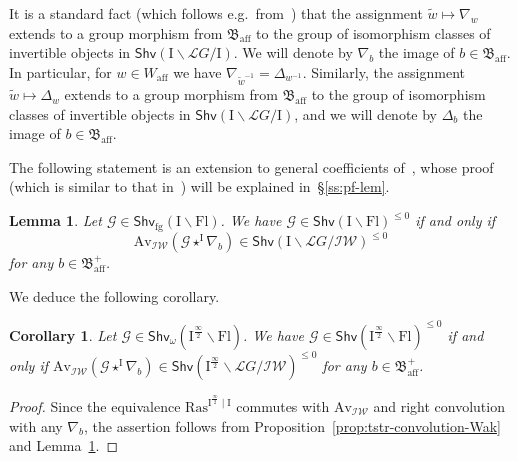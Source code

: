 \documentclass[11pt]{amsart}
\numberwithin{equation}{section}
\theoremstyle{plain}
\newtheorem{lem}[thm]{Lemma}
\newtheorem{corollary}[thm]{Corollary}
\theoremstyle{definition}
\newcommand{\sG}{{\mathcal G}}
\newcommand{\I}{{\mathrm I}}
\newcommand{\sL}{{\mathcal L}}
\newcommand{\semi}{{{\frac{\infty}{2}}}}
\newcommand{\Av}{\mathrm{Av}}
\newcommand{\IW}{\mathcal{IW}}
\newcommand{\af}{\mathrm{aff}}
\newcommand{\Shv}{\mathsf{Shv}}
\newcommand{\Shvfg}{\mathsf{Shv}_{\mathrm{fg}}}
\newcommand{\Ras}{\mathrm{Ras}}
\newcommand{\Fl}{\mathrm{Fl}}
\begin{document}
It is a standard fact (which follows e.g.~from~\cite[Lemma~4.1]{adr}) that the assignment $\widetilde{w} \mapsto \nabla_w$ extends to a group morphism from $\mathfrak{B}_\af$ to the group of isomorphism classes of invertible objects in $\Shv(\I\backslash \sL{G}/\I)$. We will denote by $\nabla_b$ the image of $b \in \mathfrak{B}_\af$. In particular, for $w \in W_\af$ we have $\nabla_{\widetilde{w}^{-1}} = \Delta_{w^{-1}}$. Similarly, the assignment $\widetilde{w} \mapsto \Delta_w$ extends to a group morphism from $\mathfrak{B}_\af$ to the group of isomorphism classes of invertible objects in $\Shv(\I\backslash \sL{G}/\I)$, and we will denote by $\Delta_b$ the image of $b \in \mathfrak{B}_\af$.

The following statement is an extension to general coefficients of~\cite[Proposition~3]{BLin}, whose proof (which is similar to that in~\cite{BLin}) will be explained in~\S\ref{ss:pf-lem}.

\begin{lem}
\label{lem:bez-lin}
Let $\sG\in \Shvfg(\I\backslash \Fl)$. 
We have $\sG\in \Shv(\I\backslash \Fl)^{\leq 0}$ if and only if
\[
\Av_\IW(\sG \star^\I \nabla_b)\in \Shv(\I\backslash \sL{G}/\IW)^{\leq 0}
\]
for any $b\in \mathfrak{B}^+_\af$. 
\end{lem}

We deduce the following corollary.

\begin{corollary}
\label{cor:tstr-criterion-IW}
Let $\sG\in \Shv_{\omega}\left(\I^\semi\backslash \Fl\right)$. 
We have $\sG\in \Shv\left(\I^\semi\backslash \Fl\right)^{\leq 0}$ if and only if $\Av_\IW(\sG \star^\I \nabla_b)\in \Shv\left(\I^\semi\backslash \sL{G}/\IW\right)^{\leq 0}$ for any $b\in \mathfrak{B}^+_\af$. 
\end{corollary}

\begin{proof}
Since the equivalence $\Ras^{\I^\semi \mid \I}$ commutes with $\Av_\IW$ and right convolution with any $\nabla_b$, the assertion follows from Proposition~\ref{prop:tstr-convolution-Wak} and Lemma~\ref{lem:bez-lin}. 
\end{proof}
\end{document}
